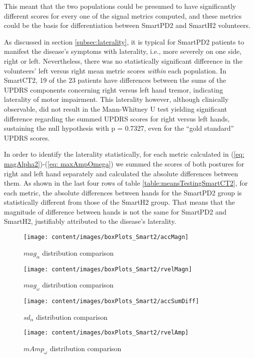 This meant that the two populations could be presumed to have significantly different scores for every one of the signal metrics computed, and these metrics could be the basis for differentiation between \gls{SmartPD2} and \gls{SmartH2} volunteers.

As discussed in section \ref{subsec:laterality}, it is typical for \gls{SmartPD2} patients to manifest the disease's symptoms with laterality, i.e., more severely on one side, right or left. Nevertheless, there was no statistically significant difference in the volunteers' left versus right mean metric scores \textit{within} each population. In \gls{SmartCT2}, 19 of the 23 patients have differences between the sums of the \gls{UPDRS} components concerning right versus left hand tremor, indicating laterality of motor impairment. This laterality however, although clinically observable, did not result in the Mann-Whitney U test yielding significant difference regarding the summed \gls{UPDRS} scores for right versus left hands, sustaining the null hypothesis with p = 0.7327, even for the ``gold standard'' \gls{UPDRS} scores. 

In order to identify the laterality statistically, for each metric calculated in (\ref{eq: magAlpha2})-(\ref{eq: maxAmpOmega}) we summed the scores of both postures for right and left hand separately and calculated the absolute differences between them. As shown in the last four rows of table \ref{table:meansTestingSmartCT2}, for each metric, the absolute differences between hands for the \gls{SmartPD2} group is statistically different from those of the \gls{SmartH2} group. That means that the magnitude of difference between hands is not the same for \gls{SmartPD2} and \gls{SmartH2}, justifiably attributed to the disease's laterality. 


\begin{figure}[!hp]
  \centering
  \texttt{[image: content/images/boxPlots\_Smart2/accMagn]}
  \caption{$mag_{\alpha}$ distribution comparison}
  \label{fig:boxAccMag}
  \texttt{[image: content/images/boxPlots\_Smart2/rvelMagn]}
  \caption{$mag_{\omega}$ distribution comparison}
  \label{fig:boxRvelMag}
\end{figure}
\begin{figure}[!hp]
  \centering
  \texttt{[image: content/images/boxPlots\_Smart2/accSumDiff]}
  \caption{$sd_{\alpha}$ distribution comparison}
  \label{fig:boxAccSumDiff}
  \texttt{[image: content/images/boxPlots\_Smart2/rvelAmp]}
  \caption{$mAmp_{\omega}$ distribution comparison}
  \label{fig:boxRvelAmp}
\end{figure}





